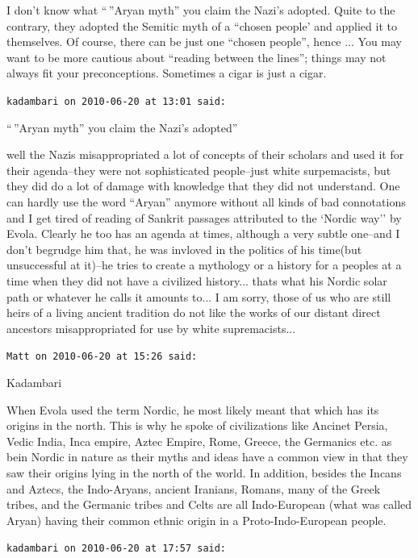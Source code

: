 \begin{footnotesize}
\begin{sffamily}
I don't know what ``\,''Aryan myth'' you claim the Nazi's adopted. Quite to the contrary, they adopted the Semitic myth of a ``chosen people' and applied it to themselves. Of course, there can be just one ``chosen people'', hence ... You may want to be more cautious about ``reading between the lines''; things may not always fit your preconceptions. Sometimes a cigar is just a cigar.

\hfill

\texttt{kadambari on 2010-06-20 at 13:01 said:}

``\,''Aryan myth'' you claim the Nazi's adopted''

well the Nazis misappropriated a lot of concepts of their scholars and used it for their agenda--they were not sophisticated people--just white surpemacists, but they did do a lot of damage with knowledge that they did not understand. One can hardly use the word ``Aryan'' anymore without all kinds of bad connotations and I get tired of reading of Sankrit passages attributed to the `Nordic way'' by Evola. Clearly he too has an agenda at times, although a very subtle one--and I don't begrudge him that, he was invloved in the politics of his time(but unsuccessful at it)--he tries to create a mythology or a history for a peoples at a time when they did not have a civilized history... thats what his Nordic solar path or whatever he calls it amounts to... I am sorry, those of us who are still heirs of a living ancient tradition do not like the works of our distant direct ancestors misappropriated for use by white supremacists... 

\hfill

\texttt{Matt on 2010-06-20 at 15:26 said:}

Kadambari

When Evola used the term Nordic, he most likely meant that which has its origins in the north. This is why he spoke of civilizations like Ancinet Persia, Vedic India, Inca empire, Aztec Empire, Rome, Greece, the Germanics etc. as bein Nordic in nature as their myths and ideas have a common view in that they saw their origins lying in the north of the world. In addition, besides the Incans and Aztecs, the Indo-Aryans, ancient Iranians, Romans, many of the Greek tribes, and the Germanic tribes and Celts are all Indo-European (what was called Aryan) having their common ethnic origin in a Proto-Indo-European people.

\hfill

\texttt{kadambari on 2010-06-20 at 17:57 said:}


\end{sffamily}
\end{footnotesize}
